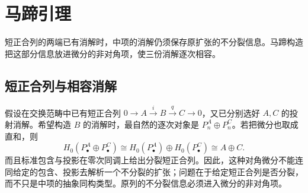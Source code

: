 
\section{马蹄引理}
\label{b4:sec:0703}

短正合列的两端已有消解时，中项的消解仍须保存原扩张的不分裂信息。马蹄构造把这部分信息放进微分的非对角项，使三份消解逐次相容。


%
%

\subsection{短正合列与相容消解}
\label{b4:subsec:0703:01}

假设在交换范畴中已有短正合列 \(0\to A\xrightarrow{i}B\xrightarrow{q}C\to0\)，又已分别选好 \(A,C\) 的投射消解。希望构造 \(B\) 的消解时，最自然的逐次对象是 \(P_n^A\oplus P_n^C\)。若把微分也取成直和，则
\[
	H_0(P^A_\bullet\oplus P^C_\bullet) \cong H_0(P^A_\bullet)\oplus H_0(P^C_\bullet) \cong A\oplus C.
\]
而且标准包含与投影在零次同调上给出分裂短正合列。因此，这种对角微分不能连同给定的包含、投影去解析一个不分裂的扩张；问题在于给定短正合列是否分裂，而不只是中项的抽象同构类型。原列的不分裂信息必须进入微分的非对角项。

